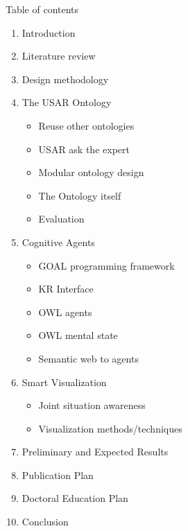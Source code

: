 Table of contents
\tableofcontents

\begin{enumerate}
\item Introduction
\item Literature review
\item Design methodology
\item The USAR Ontology
\begin{itemize}
\item Reuse other ontologies
\item USAR ask the expert 
\item Modular ontology design
\item The Ontology itself
\item Evaluation
\end{itemize}

\item Cognitive Agents
\begin{itemize}
\item GOAL programming framework
\item KR Interface
\item OWL agents
\item OWL mental state
\item Semantic web to agents
\end{itemize}

\item Smart Visualization
\begin{itemize}
\item Joint situation awareness
\item Visualization methods/techniques
\end{itemize}

\item Preliminary and Expected Results
\item Publication Plan
\item Doctoral Education Plan
\item Conclusion
\end{enumerate}
    
    
  
  
  
  
  
  
  